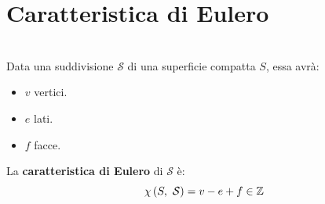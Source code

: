 \section{Caratteristica di Eulero}
\begin{define}~{}\\
	Data una suddivisione $\mathcal{S}$ di una superficie compatta $S$, essa avrà:
	\begin{itemize}
		\item $v$ vertici.
		\item $e$ lati.
		\item $f$ facce.
	\end{itemize}
La \textbf{caratteristica di Eulero} di $\mathcal{S}$ è:
\begin{equation}
	\euler{S}{\mathcal{S}}=v-e+f\in\integerset
\end{equation}
\vspace{-6mm}
\end{define}
